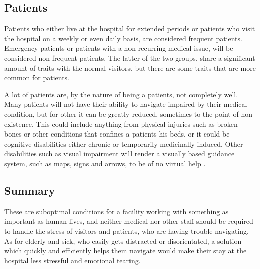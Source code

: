 \subsection{Patients}

Patients who either live at the hospital for extended periods or patients who visit the hospital on a weekly or even daily basis, are considered frequent patients. Emergency patients or patients with a non-recurring medical issue, will be considered non-frequent patients. The latter of the two groups, share a significant amount of traits with the normal visitors, but there are some traits that are more common for patients.

A lot of patients are, by the nature of being a patients, not completely well. Many patients will not have their ability to navigate impaired by their medical condition, but for other it can be greatly reduced, sometimes to the point of non-existence. This could include anything from physical injuries such as broken bones or other conditions that confines a patients his beds, or it could be cognitive disabilities either chronic or temporarily medicinally induced. Other disabilities such as visual impairment will render a visually based guidance system, such as maps, signs and arrows, to be of no virtual help \cite{visual_impairment}.


\subsection{Summary}

These are suboptimal conditions for a facility working with something as important as human lives, and neither medical nor other staff should be required to handle the stress of visitors and patients, who are having trouble navigating. As for elderly and sick, who easily gets distracted or disorientated, a solution which quickly and efficiently helps them navigate would make their stay at the hospital less stressful and emotional tearing.